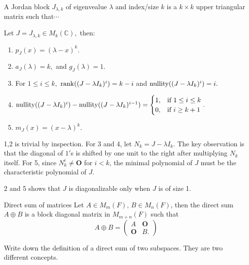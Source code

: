 \begin{definition}
    A Jordan block $J_{\lambda, k}$ of eigenvealue $\lambda$ and index/size $k$ is a $k\times k$ upper triangular matrix such that$\cdots$ 
\end{definition}

\begin{theorem}
Let $J=J_{\lambda, k}\in M_k(\mathbb{C}),$ then:
\begin{enumerate}
    \item $p_J(x)=(\lambda-x)^k.$
    \item $a_J(\lambda)=k,$ and $g_J(\lambda)=1.$
    \item For $1\le i\le k,$ $\operatorname{rank}((J-\lambda I_k)^i)=k-i$ and $\operatorname{nullity}((J-\lambda I_k)^i)= i.$
    \item $\operatorname{nullity}((J-\lambda I_k)^i)-\operatorname{nullity}((J-\lambda I_k)^{i-1}) =
\begin{cases}
1, & \text{if } 1 \leq i \leq k \\
0, & \text{if } i \geq k+1
\end{cases}.$
    \item $m_J(x)=(x-\lambda)^k.$
\end{enumerate}
\label{JB_property}
\end{theorem}



\begin{pfbox}
1,2 is trivial by inspection. For 3 and 4, let $N_k=J-\lambda I_k$. The key observation is that the diagonal of $1'$s is shifted by one unit to the right after multiplying $N_k$ itself.
For 5, since $N_k^i\neq \mathbf{O}$ for $i < k$, the minimal polynomial of $J$ must be the characteristic polynomial of $J$.
\end{pfbox}


\begin{remark}
2 and 5 shows that $J$ is diagonalizable only when $J$ is of size 1.
\end{remark}


\begin{definition}{Direct sum of matrices}
  Let $A\in M_m(F),\,B\in M_n(F)$, then the direct sum $A\oplus B$ is a block diagonal matrix in $M_{m+n}(F)$ such that
  \[A\oplus B = \begin{pmatrix}
    A & \mathbf{O}\\
    \mathbf{O} & B.
  \end{pmatrix}\]
\end{definition}

\begin{exercise}
    Write down the definition of a direct sum of two subspaces. They are two different concepts.
\end{exercise}

